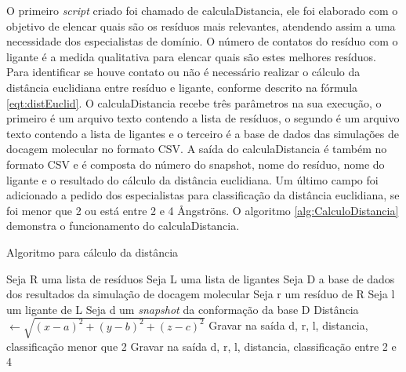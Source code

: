 O primeiro \emph{script} criado foi chamado de calculaDistancia, ele foi elaborado com o objetivo de elencar quais são os resíduos mais relevantes, atendendo assim a uma necessidade dos especialistas de domínio. O número de contatos do resíduo com o ligante é a medida qualitativa para elencar quais são estes melhores resíduos. Para identificar se houve contato ou não é necessário realizar o cálculo da distância euclidiana entre resíduo e ligante, conforme descrito na fórmula \ref{eqt:distEuclid}. O calculaDistancia recebe três parâmetros na sua execução, o primeiro é um arquivo texto contendo a lista de resíduos, o segundo é um arquivo texto contendo a lista de ligantes e o terceiro é a base de dados das simulações de docagem molecular no formato CSV. A saída do calculaDistancia é também no formato CSV e é composta do número do snapshot, nome do resíduo, nome do ligante e o resultado do cálculo da distância euclidiana. Um último campo foi adicionado a pedido dos especialistas para classificação da distância euclidiana, se foi menor que 2 ou está entre 2 e 4 {\AA}ngstr\"ons. O algoritmo \ref{alg:CalculoDistancia} demonstra o funcionamento do calculaDistancia.

\renewcommand{\algorithmicfor}{\textbf{para}}
\renewcommand{\algorithmicif}{\textbf{se}}
\renewcommand{\algorithmicthen}{\textbf{então}}
\renewcommand{\algorithmicelse}{\textbf{senão}}
\renewcommand{\algorithmicendif}{\textbf{fim se}}
\renewcommand{\algorithmicendfor}{\textbf{fim para}}
\renewcommand{\algorithmicdo}{\textbf{faça}}

\begin{algorithm}[H]
\caption{Algoritmo para cálculo da distância}
\label{alg:CalculoDistancia}
{\fontsize{10}{10}\selectfont
\begin{algorithmic}[1]
	\STATE Seja R uma lista de resíduos
	\STATE Seja L uma lista de ligantes
	\STATE Seja D a base de dados dos resultados da simulação de docagem molecular
	\STATE Seja r um resíduo de R
	\STATE Seja l um ligante de L
	\STATE Seja d um \emph{snapshot} da conformação da base D
			\STATE Distância $\gets \sqrt{(x - a)^{2} +(y - b)^{2} + (z - c)^{2}}$ 
			\ENDIF
				\STATE Gravar na saída d, r, l, distancia, classificação menor que 2
				\ELSE
				\STATE Gravar na saída d, r, l, distancia, classificação entre 2 e 4
				\ENDIF
			\ENDIF
			\ENDFOR
		\ENDFOR
	\ENDFOR
\end{algorithmic}
}
\end{algorithm}

